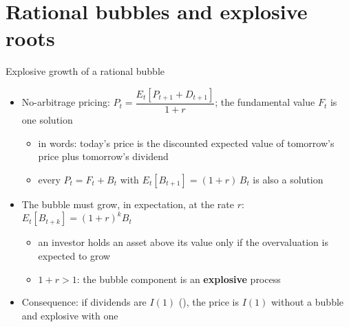 \section{Rational bubbles and explosive roots}

\begin{frame}{Explosive growth of a rational bubble}
\itemsize{\footnotesize}
\begin{itemize}
    \item No-arbitrage pricing: $P_t = \dfrac{E_t[P_{t+1} + D_{t+1}]}{1+r}$; the fundamental value $F_t$ is one solution
    \begin{itemize}
        \item in words: today's price is the discounted expected value of tomorrow's price plus tomorrow's dividend
        \item every $P_t = F_t + B_t$ with $E_t[B_{t+1}] = (1+r)\,B_t$ is also a solution
    \end{itemize}
    \item The bubble must grow, in expectation, at the rate $r$: $E_t[B_{t+k}] = (1+r)^k B_t$
    \begin{itemize}
        \item an investor holds an asset above its value only if the overvaluation is expected to grow
        \item $1+r > 1$: the bubble component is an \textbf{explosive} process
    \end{itemize}
    \item Consequence: if dividends are $I(1)$ (), the price is $I(1)$ without a bubble and explosive with one
\end{itemize}
\end{frame}

